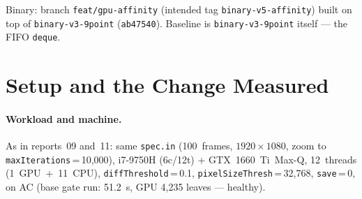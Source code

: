 \documentclass[
	english,
	letterpaper, oneside
]{article}
\begin{document}
\templatePagecfg
\templateFinalcfg

\inserttitle

\begin{center}\small\textsf{%
Binary: branch \texttt{feat/gpu-affinity} (intended tag \texttt{binary-v5-affinity})
built on top of \texttt{binary-v3-9point} (\texttt{ab47540}). Baseline is
\texttt{binary-v3-9point} itself --- the FIFO \texttt{deque}.%
}\end{center}

\begin{abstract}
Report~11 showed a shared largest-first priority queue cannot route the
$\sim$14~s interior outlier to the GPU: with eleven CPU threads versus one GPU
thread, a CPU thread extracts it $\sim$11:1. This report fixes that with
executor-aware extraction: \texttt{WorkQueue} becomes a min-max
\texttt{multiset} ordered by pixel count, the GPU thread pops the
largest region and CPU threads pop the smallest. Measured against the
FIFO baseline (100~frames, $1920\times1080$, i7-9750H + GTX~1660~Ti~Max-Q,
12~threads, \texttt{diffT}\,=\,0.1, \texttt{save}\,=\,0, on AC), this is the
first change to move the wall: 49.86~s vs.\ 51.73~s, $-3.6\%$,
statistically clean (every affinity rep beats every base rep; ranges do not
overlap). The mechanism is exactly as designed: the GPU now takes the
$960\times540$ outlier (460~ms on the GPU, CUPTI kernel max, vs.\ 13.3~s
on a CPU thread) plus 259 interior $480\times270$ regions; the CPU's
worst region collapses from 13.3~s to 1.34~s, its median from 88~ms to 8.7~ms,
and CPU outliers drop from 1 to 0. The gain is bounded at $-3.6\%$
because the GPU is now $\sim$91\,\% utilised --- near saturation --- so the CPU
pool ($\sim$49.5~s) is the new wall and further gains require work-reduction, not
scheduling.
\end{abstract}

\section{Setup and the Change Measured}

\paragraph{Workload and machine.} As in reports~09 and~11: same \texttt{spec.in}
(100~frames, $1920\times1080$, zoom to \texttt{maxIterations}\,=\,10{,}000),
i7-9750H (6c/12t) + GTX~1660~Ti~Max-Q, 12~threads (1~GPU~+~11~CPU),
\texttt{diffThreshold}\,=\,0.1, \texttt{pixelSizeThresh}\,=\,32{,}768,
\texttt{save}\,=\,0, on AC (base gate run: 51.2~s, GPU 4{,}235 leaves --- healthy).
\end{document}
